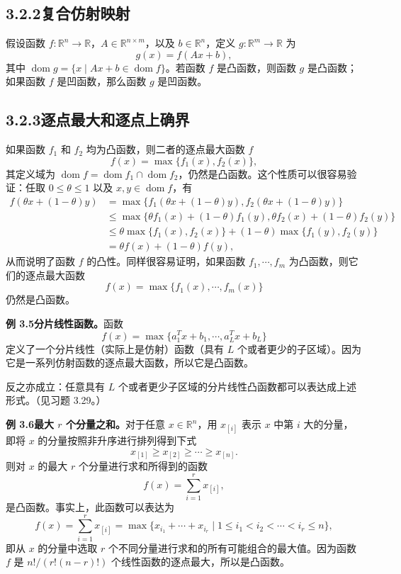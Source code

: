 \documentclass[UTF8, 12pt, fontset=fandol, oneside]{ctexart}
\DeclareMathOperator{\dom}{dom}
\begin{document}
\subsection*{3.2.2\quad 复合仿射映射}

假设函数 $f:\mathbb{R}^n\to\mathbb{R}$，$A\in\mathbb{R}^{n\times m}$，以及 $b\in\mathbb{R}^n$，定义 $g:\mathbb{R}^m\to\mathbb{R}$ 为
\[
g(x)=f(Ax+b),
\]
其中 $\dom g=\{x\mid Ax+b\in\dom f\}$。若函数 $f$ 是凸函数，则函数 $g$ 是凸函数；如果函数 $f$ 是凹函数，那么函数 $g$ 是凹函数。

\subsection*{3.2.3\quad 逐点最大和逐点上确界}

如果函数 $f_1$ 和 $f_2$ 均为凸函数，则二者的逐点最大函数 $f$
\[
f(x)=\max\{f_1(x),f_2(x)\},
\]
其定义域为 $\dom f=\dom f_1\cap\dom f_2$，仍然是凸函数。这个性质可以很容易验证：任取 $0\leq\theta\leq1$ 以及 $x,y\in\dom f$，有
\[
\begin{aligned}
f(\theta x+(1-\theta)y)
&=\max\{f_1(\theta x+(1-\theta)y),f_2(\theta x+(1-\theta)y)\}\\
&\leq \max\{\theta f_1(x)+(1-\theta)f_1(y),\theta f_2(x)+(1-\theta)f_2(y)\}\\
&\leq \theta\max\{f_1(x),f_2(x)\}+(1-\theta)\max\{f_1(y),f_2(y)\}\\
&=\theta f(x)+(1-\theta)f(y),
\end{aligned}
\]
从而说明了函数 $f$ 的凸性。同样很容易证明，如果函数 $f_1,\cdots,f_m$ 为凸函数，则它们的逐点最大函数
\[
f(x)=\max\{f_1(x),\cdots,f_m(x)\}
\]
仍然是凸函数。

\noindent\textbf{例 3.5\quad 分片线性函数。}\quad 函数
\[
f(x)=\max\{a_1^Tx+b_1,\cdots,a_L^Tx+b_L\}
\]
定义了一个分片线性（实际上是仿射）函数（具有 $L$ 个或者更少的子区域）。因为它是一系列仿射函数的逐点最大函数，所以它是凸函数。

反之亦成立：任意具有 $L$ 个或者更少子区域的分片线性凸函数都可以表达成上述形式。（见习题 3.29。）

\noindent\textbf{例 3.6\quad 最大 $r$ 个分量之和。}\quad 对于任意 $x\in\mathbb{R}^n$，用 $x_{[i]}$ 表示 $x$ 中第 $i$ 大的分量，即将 $x$ 的分量按照非升序进行排列得到下式
\[
x_{[1]}\geq x_{[2]}\geq \cdots\geq x_{[n]}.
\]
则对 $x$ 的最大 $r$ 个分量进行求和所得到的函数
\[
f(x)=\sum_{i=1}^r x_{[i]},
\]
是凸函数。事实上，此函数可以表达为
\[
f(x)=\sum_{i=1}^r x_{[i]}=
\max\{x_{i_1}+\cdots+x_{i_r}\mid 1\leq i_1<i_2<\cdots<i_r\leq n\},
\]
即从 $x$ 的分量中选取 $r$ 个不同分量进行求和的所有可能组合的最大值。因为函数 $f$ 是 $n!/(r!(n-r)!)$ 个线性函数的逐点最大，所以是凸函数。
\end{document}
